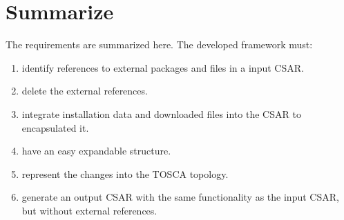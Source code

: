 \section*{Summarize}
The requirements are summarized here. 
The developed framework must:
\begin{enumerate}
	\item identify references to external packages and files in a input CSAR.\label{req:identify}
	\item delete the external references.\label{req:delete}
	\item integrate installation data and downloaded files into the CSAR to encapsulated it.\label{req:adddata}
	\item have an easy expandable structure.\label{req:expand}
	\item represent the changes into the TOSCA topology.\label{req:represent}
	\item generate an output CSAR with the same functionality as the input CSAR, but without external references.\label{req:out}
\end{enumerate}
